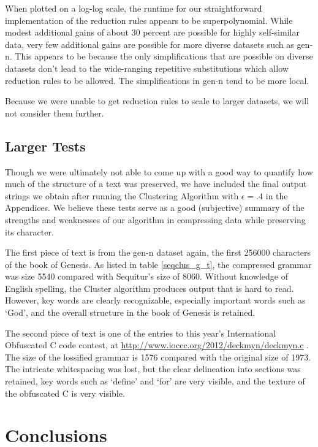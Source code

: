 \documentclass[11pt]{article}
\begin{document}
When plotted on a log-log scale, the runtime for our straightforward 
implementation of the reduction
rules appears to be superpolynomial. While modest additional gains of about 30 percent
are possible for highly self-similar data, very few additional gains are
possible for more diverse datasets such as gen-n. This appears to be because
the only simplifications that are possible on diverse datasets don't lead to
the wide-ranging repetitive substitutions which allow reduction rules to be allowed.
The simplifications in gen-n tend to be more local.

Because we were unable to get reduction rules to scale to larger datasets,
we will not consider them further.


\subsection{Larger Tests}

Though we were ultimately not able to come up with a good way to quantify how much of the
structure of a text was preserved, we have included the final output strings we obtain
after running the Clustering Algorithm with $\epsilon = .4$ in the Appendices. We
believe these tests serve as a good (subjective) summary of the strengths and
weaknesses of our
algorithm in compressing data while preserving
its character.

The first piece of text is from the gen-n dataset again, the first 256000 characters
of the book of Genesis. As listed in table \ref{seqclus_g_t}, the compressed grammar
was size 5540 compared with Sequitur's size of 8060. Without knowledge of English 
spelling, the Cluster algorithm produces output that is hard to read. However,
key words are clearly recognizable, especially important words such as `God', and
the overall structure in the book of Genesis is retained.

The second piece of text is one of the entries to this year's International
Obfuscated C code contest, at \url{http://www.ioccc.org/2012/deckmyn/deckmyn.c} .
The size of the lossified grammar is 1576 compared with the original size of
1973. The intricate whitespacing was lost, but the clear delineation into
sections was retained, key words such as `define' and `for' are very visible,
and the texture of the obfuscated C is very visible.

\section{Conclusions}
\end{document}
